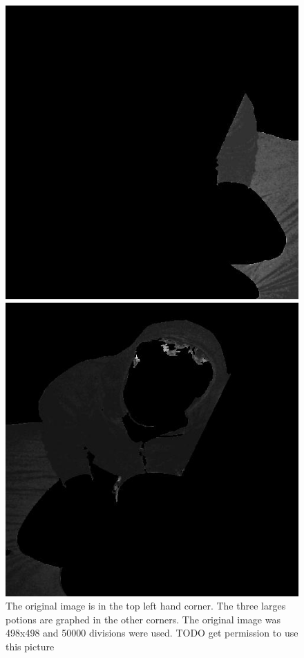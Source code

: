 \begin{figure}[ht]
\begin{minipage}[b]{0.47\linewidth}
\end{minipage}
\begin{minipage}[b]{0.47\linewidth}
\centering
\includegraphics[width=\textwidth]{MSTseg3.jpg}
\end{minipage}
\hspace{0.5cm}
\begin{minipage}[b]{0.47\linewidth}
\centering
\includegraphics[width=\textwidth]{MSTseg4.jpg}
\end{minipage}
\caption{The original image is in the top left hand corner. The three larges potions are graphed in the other corners. The original image was 498x498 and 50000 divisions were used. TODO get permission to use this picture}
\end{figure}
\vfill


